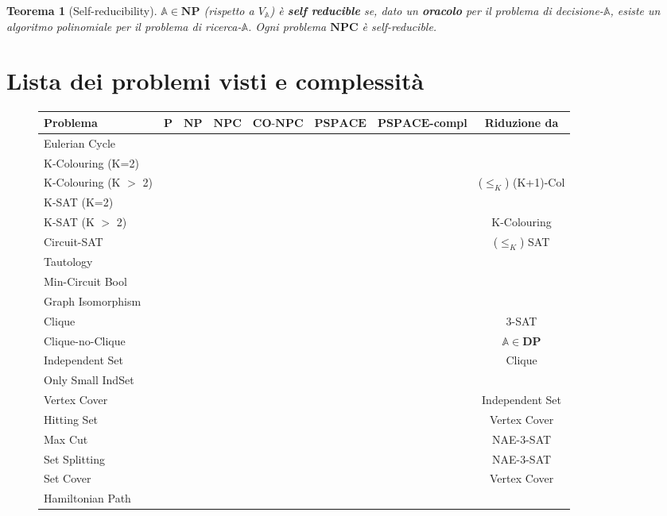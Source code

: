 \documentclass[a4paper, 11pt]{article}
\newcommand{\p}{\mathbf{P}}
\newcommand{\np}{\mathbf{NP}}
\newcommand{\npc}{\mathbf{NPC}}
\newcommand{\conp}{\mathbf{CO}\text{-}\mathbf{NP}}
\newcommand{\pspace}{\mathbf{PSPACE}}
\newcommand{\prob}[1]{\mathbb{#1}}
\newtheorem{thm}{Teorema}[subsection]
\begin{document}
	\begin{thm}[Self-reducibility]
					$ \prob{A}\in \np $ (rispetto a $ V_{\prob{A}} $) è \textbf{self reducible} se, dato un \textbf{oracolo} per il problema di decisione-$\prob{A} $, esiste un algoritmo polinomiale per il problema di ricerca-$\prob{A} $. Ogni problema $\npc$ è self-reducible.
	\end{thm}
	
	\newpage
	\section{Lista dei problemi visti e complessità}
	\begin{figure}[h!]
		\begin{tabular}{lccccccc}
			\toprule
			\textbf{Problema} & {\small $ \p $} & {\small $ \np $} & {\small $ \npc $} & {\small $ \conp\mathbf{C} $} & {\small $ \pspace $} & {\small $ \pspace$-compl} & {\small \textbf{Riduzione da}}\\
			\midrule
			Eulerian Cycle & \checkmark & & & & \checkmark & & \\
			K-Colouring (K=2) & \checkmark & & & & \checkmark & & \\
			K-Colouring (K $>$ 2) & & \checkmark & \checkmark & & \checkmark & & ($ \leq_K $) (K+1)-Col  \\
			K-SAT (K=2) & \checkmark & & & & \checkmark & & \\
			K-SAT (K $>$ 2) & & \checkmark & \checkmark & & \checkmark & & K-Colouring\\
			Circuit-SAT & & \checkmark & \checkmark & & \checkmark &  & ($ \leq_K $) SAT\\
			Tautology & & & & \checkmark & \checkmark & & \\
			Min-Circuit Bool\footnotemark[1] & & & & & \checkmark & & \\
			Graph Isomorphism & & \checkmark & & & \checkmark & & \\
			Clique & & \checkmark & \checkmark & & \checkmark & & 3-SAT \\
			Clique-no-Clique & & \checkmark & \checkmark & & \checkmark & & $ \prob{A}\in\mathbf{DP} $\\
			Independent Set & & \checkmark & \checkmark & & \checkmark & & Clique \\
			Only Small IndSet & & & & \checkmark & \checkmark & & \\
			Vertex Cover & & \checkmark & \checkmark & & \checkmark & & Independent Set\\
			Hitting Set & & \checkmark & \checkmark & & \checkmark & & Vertex Cover \\
			Max Cut & & \checkmark & \checkmark & & \checkmark & & NAE-3-SAT\\
			Set Splitting & & \checkmark & \checkmark & & \checkmark & & NAE-3-SAT\\
			Set Cover & & \checkmark & \checkmark & & \checkmark & & Vertex Cover\\
			Hamiltonian Path & & \checkmark & \checkmark & & \checkmark & &  \\


\end{tabular}
\end{figure}
\end{document}

